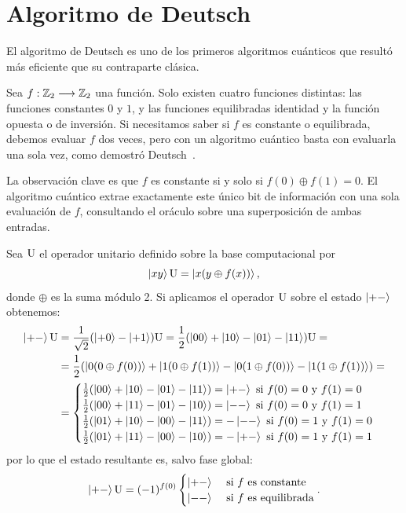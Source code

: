 \section{Algoritmo de Deutsch}\label{sec:deutsch-algorithm}
El algoritmo de Deutsch es uno de los primeros algoritmos cuánticos que resultó más eficiente que su contraparte clásica.

Sea $f:\mathbb{Z}_2\longrightarrow\mathbb{Z}_2$ una función.
Solo existen cuatro funciones distintas: las funciones constantes $0$ y $1$, y las funciones equilibradas identidad y la función opuesta o de inversión.
Si necesitamos saber si $f$ es constante o equilibrada, debemos evaluar $f$ dos veces, pero con un algoritmo cuántico basta con evaluarla una sola vez, como demostró Deutsch~\cite{Deutsch1985}.

La observación clave es que $f$ es constante si y solo si $f(0)\oplus f(1)=0$.
El algoritmo cuántico extrae exactamente este único bit de información con una sola evaluación de $f$, consultando el oráculo sobre una superposición de ambas entradas.

Sea $\text{U}$ el operador unitario definido sobre la base computacional por
\[
	\ket{xy}\text{U}=\ket{x(y\oplus f(x))},
\]
donde $\oplus$ es la suma módulo 2.
Si aplicamos el operador $\text{U}$ sobre el estado $\ket{+-}$ obtenemos:
\[
	\begin{split}
	\ket{+-}\text{U} &= \frac{1}{\sqrt{2}}(\ket{+0}-\ket{+1})\text{U}=\frac{1}{2}(\ket{00}+\ket{10}-\ket{01}-\ket{11})\text{U}=\\
	&= \frac{1}{2}(\ket{0(0\oplus f(0))}+\ket{1(0\oplus f(1))}-\ket{0(1\oplus f(0))}-\ket{1(1\oplus f(1))})=\\
		&=\begin{cases}
				\frac{1}{2}(\ket{00}+\ket{10}-\ket{01}-\ket{11})=\ket{+-}\text{ si $f(0)=0$ y $f(1) = 0$}\\
				\frac{1}{2}(\ket{00}+\ket{11}-\ket{01}-\ket{10})=\ket{--}\text{ si $f(0)=0$ y $f(1) = 1$}\\
				\frac{1}{2}(\ket{01}+\ket{10}-\ket{00}-\ket{11})=-\ket{--}\text{ si $f(0)=1$ y $f(1) = 0$}\\
				\frac{1}{2}(\ket{01}+\ket{11}-\ket{00}-\ket{10})=-\ket{+-}\text{ si $f(0)=1$ y $f(1) = 1$}
	\end{cases}
	\end{split}
\]
por lo que el estado resultante es, salvo fase global:
\[
	\ket{+-}\text{U}=(-1)^{f(0)}\begin{cases}
		            \ket{+-} & \text{ si $f$ es constante} \\
		            \ket{--} & \text{ si $f$ es equilibrada}
	\end{cases}.
\]

